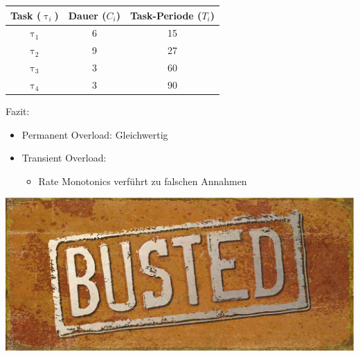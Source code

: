 \newcommand{\showRMSlideRob}[1] {\begin{frame}{\subsubsecname}
	\begin{center}
		\begin{tabular}{c||c|c}
			Task ($\uptau_i$) & Dauer ($C_i$) & Task-Periode ($T_i$)\\\hline\hline
			$\uptau_1$ & 6 & 15\\
			$\uptau_2$ & 9 & 27\\
			$\uptau_3$ & 3 & 60\\
			$\uptau_4$ & 3 & 90
		\end{tabular}
	\end{center}
	
\end{frame}}

%
{%
	\showRMSlideRob{\arabic{ct}}
}

\begin{frame}{\subsecname}
	Fazit:
	\begin{itemize}
		\item Permanent Overload: Gleichwertig
		\item Transient Overload:
		\begin{itemize}
			\item Rate Monotonics verführt zu falschen Annahmen
		\end{itemize}
	\end{itemize}
\end{frame}

\begin{frame}{\subsecname}
	\begin{center}
			\includegraphics[scale=1]{graphics/memes/busted.jpg}
	\end{center}
\end{frame}